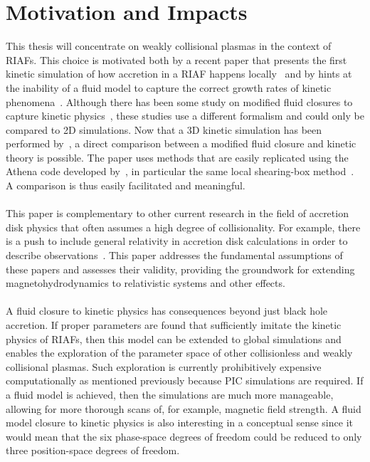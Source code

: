 \section{Motivation and Impacts}
This thesis will concentrate on weakly collisional plasmas in the context of RIAFs. This choice is motivated both by a recent paper that presents the first kinetic simulation of how accretion in a RIAF happens locally~\cite{Kunz2016} and by hints at the inability of a fluid model to capture the correct growth rates of kinetic phenomena~\cite{Sharma2004}. Although there has been some study on modified fluid closures to capture kinetic physics~\cite{Sharma2006,Sharma2007,Sharma2003,SharmaThesis}, these studies use a different formalism and could only be compared to 2D simulations. Now that a 3D kinetic simulation has been performed by~\citet{Kunz2016}, a direct comparison between a modified fluid closure and kinetic theory is possible. The paper uses methods that are easily replicated using the Athena code developed by~\citet{Stone2008}, in particular the same local shearing-box method~\cite{Stone2010}. A comparison is thus easily facilitated and meaningful. \\
\\
This paper is complementary to other current research in the field of accretion disk physics that often assumes a high degree of collisionality. For example, there is a push to include general relativity in accretion disk calculations in order to describe observations~\cite{Moscibrodzka2014,Ressler2015,Shiokawa2013,Sadowski2016,Niedzwiecki2014,Narayan1998,Gammie2003,Noble2006,Noble2009,Chan2015,Mocibrodzka2009}. This paper addresses the fundamental assumptions of these papers and assesses their validity, providing the groundwork for extending magnetohydrodynamics to relativistic systems and other effects.\\
\\
A fluid closure to kinetic physics has consequences beyond just black hole accretion. If proper parameters are found that sufficiently imitate the kinetic physics of RIAFs, then this model can be extended to global simulations and enables the exploration of the parameter space of other collisionless and weakly collisional plasmas. Such exploration is currently prohibitively expensive computationally as mentioned previously because PIC simulations are required. If a fluid model is achieved, then the simulations are much more manageable, allowing for more thorough scans of, for example, magnetic field strength. A fluid model closure to kinetic physics is also interesting in a conceptual sense since it would mean that the six phase-space degrees of freedom could be reduced to only three position-space degrees of freedom. \\
